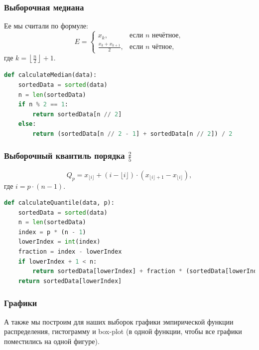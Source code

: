 \documentclass[14pt]{extreport}
\begin{document}
\subsubsection{Выборочная медиана}
Ее мы считали по формуле:
\[
E = 
\begin{cases}
x_{k}, & \text{если } n \text{ нечётное}, \\
\frac{x_{k} + x_{k+1}}{2}, & \text{если } n \text{ чётное},
\end{cases}
\]
где \( k = \left\lfloor \frac{n}{2} \right\rfloor + 1 \).

\begin{lstlisting}[language=Python, caption={Функция поиска выборочной медианы}]
def calculateMedian(data):
    sortedData = sorted(data)
    n = len(sortedData)
    if n % 2 == 1:
        return sortedData[n // 2]
    else:
        return (sortedData[n // 2 - 1] + sortedData[n // 2]) / 2
\end{lstlisting}

\subsubsection{Выборочный квантиль порядка \(\frac{2}{5}\)}
\[
Q_p = x_{\lfloor i \rfloor} + (i - \lfloor i \rfloor) \cdot (x_{\lfloor i \rfloor + 1} - x_{\lfloor i \rfloor}),
\]
где \( i = p \cdot (n - 1) \).

\begin{lstlisting}[language=Python, caption={Функция поиска выборочного квантиля порядка \(\frac{2}{5}\)}]
def calculateQuantile(data, p):
    sortedData = sorted(data)
    n = len(sortedData)
    index = p * (n - 1)
    lowerIndex = int(index)
    fraction = index - lowerIndex
    if lowerIndex + 1 < n:
        return sortedData[lowerIndex] + fraction * (sortedData[lowerIndex + 1] - sortedData[lowerIndex])
    return sortedData[lowerIndex]
\end{lstlisting}

\subsubsection{Графики}
А также мы построим для наших выборок графики эмпирической функции распределения,
гистограмму и box-plot (в одной функции, чтобы все графики поместились на одной фигуре).
\end{document}
